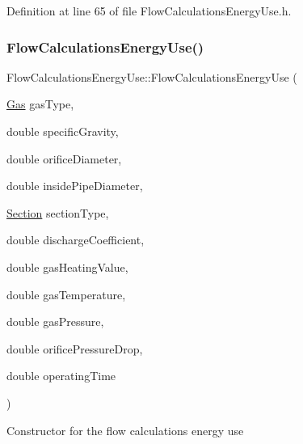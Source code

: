 Definition at line 65 of file Flow\+Calculations\+Energy\+Use.\+h.

\mbox{\label{class_flow_calculations_energy_use_a37514554d3cb04764b27d648966de471}} 
\subsubsection{\texorpdfstring{Flow\+Calculations\+Energy\+Use()}{FlowCalculationsEnergyUse()}\hspace{0.1cm}{\footnotesize\ttfamily [3/3]}}
{\footnotesize\ttfamily Flow\+Calculations\+Energy\+Use\+::\+Flow\+Calculations\+Energy\+Use (\begin{DoxyParamCaption}\item[{\hyperlink{class_flow_calculations_energy_use_a840d5a836e7b05d6791b79bace4440f2}{Gas}}]{gas\+Type,  }\item[{double}]{specific\+Gravity,  }\item[{double}]{orifice\+Diameter,  }\item[{double}]{inside\+Pipe\+Diameter,  }\item[{\hyperlink{class_flow_calculations_energy_use_afbabab0da698748de91369a5dfc7662a}{Section}}]{section\+Type,  }\item[{double}]{discharge\+Coefficient,  }\item[{double}]{gas\+Heating\+Value,  }\item[{double}]{gas\+Temperature,  }\item[{double}]{gas\+Pressure,  }\item[{double}]{orifice\+Pressure\+Drop,  }\item[{double}]{operating\+Time }\end{DoxyParamCaption})\hspace{0.3cm}{\ttfamily [inline]}}

Constructor for the flow calculations energy use


